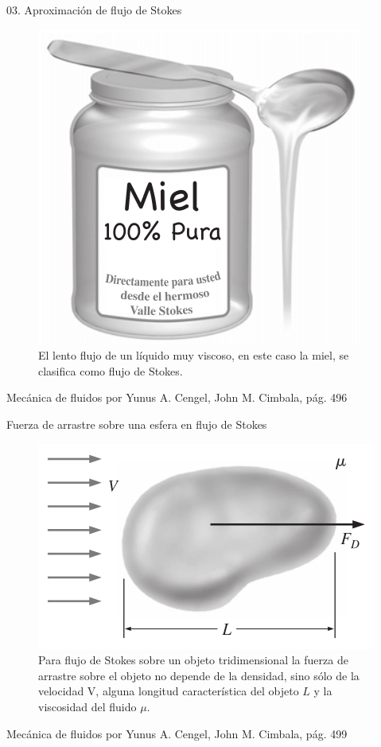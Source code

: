 \begin{frame}{03. Aproximación de flujo de Stokes}
\justifying
\begin{figure}[H]
\centering
\includegraphics[scale=0.35]{Section_Files/S3-imagenes-Jhon/0022.png}
\caption{El lento flujo de un líquido muy viscoso, en este caso la miel, se clasifica como flujo de Stokes.}
\end{figure}
{\tiny Mecánica de fluidos por Yunus A. Cengel, John M. Cimbala, pág. 496}
\end{frame}


\begin{frame}{Fuerza de arrastre sobre una esfera en flujo de Stokes}
\justifying
\begin{figure}[H]
\centering
\includegraphics[scale=0.35]{Section_Files/S3-imagenes-Jhon/0031.png}
\caption{Para flujo de Stokes sobre un objeto tridimensional la fuerza de arrastre sobre el objeto no depende de la densidad, sino sólo de la velocidad V, alguna longitud característica del objeto $ L $ y la viscosidad del fluido $ \mu $.}
\end{figure}
{\tiny Mecánica de fluidos por Yunus A. Cengel, John M. Cimbala, pág. 499}
\end{frame}

